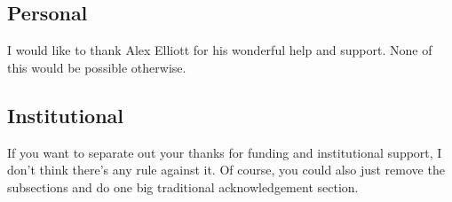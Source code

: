 \subsection*{Personal}

I would like to thank Alex Elliott for his wonderful help and support. None of this would be possible otherwise.


\subsection*{Institutional}

If you want to separate out your thanks for funding and institutional support, I don't think there's any rule against it.  Of course, you could also just remove the subsections and do one big traditional acknowledgement section.
